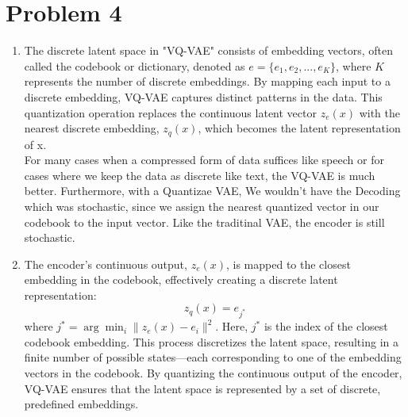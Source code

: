 \documentclass{article}
\begin{document}
\section{Problem 4}
\begin{enumerate}
    \item 
    The discrete latent space in "VQ-VAE" consists of embedding vectors, often called the codebook or dictionary, denoted as $e=\{e_1,e_2,...,e_K\}$, where $K$ represents the number of discrete embeddings. By mapping each input to a discrete embedding, VQ-VAE captures distinct patterns in the data. This quantization operation replaces the continuous latent vector $z_e(x)$ with the nearest discrete embedding, $z_q(x)$, which becomes the latent representation of x.
    \\ For many cases when a compressed form of data suffices like speech or for cases where we keep the data as discrete like text, the VQ-VAE is much better. Furthermore, with a Quantizae VAE, We wouldn't have the Decoding which was stochastic, since we assign the nearest quantized vector in our codebook to the input vector. Like the traditinal VAE, the encoder is still stochastic. 
    \item 
    The encoder’s continuous output, \( z_e(x) \), is mapped to the closest embedding in the codebook, 
    effectively creating a discrete latent representation: 
    \[ z_q(x) = e_{j^*} \]
    where \( j^* = \arg \min_i \| z_e(x) - e_i \|^2 \).
    Here, \( j^* \) is the index of the closest codebook embedding.
    This process discretizes the latent space, resulting in a finite number of possible states—each corresponding 
    to one of the embedding vectors in the codebook. 
    By quantizing the continuous output of the encoder, VQ-VAE ensures that the latent space is represented 
    by a set of discrete, predefined embeddings.


\end{enumerate}
\end{document}
